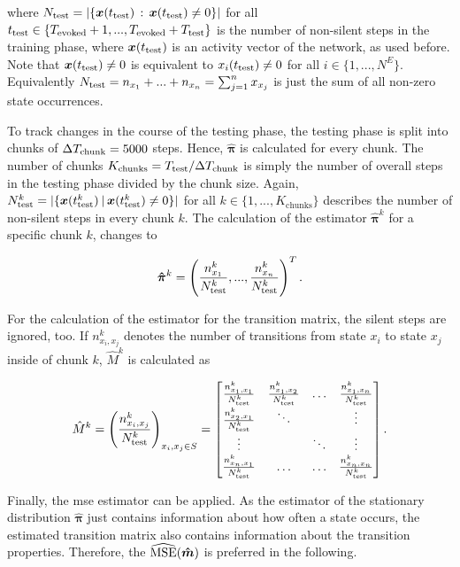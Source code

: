 where $N_{\text{test}} = |\{ \bm x(t_{\text{test}}) \,:\, \bm x(t_{\text{test}}) \neq 0 \}|$ for all $t_{\text{test}} \in \{ T_{\text{evoked}} + 1, ..., T_{\text{evoked}}+T_{\text{test}} \}$ is the number of non-silent steps in the training phase, where $\bm x(t_{\text{test}})$ is an activity vector of the network, as used before. Note that $\bm x(t_{\text{test}}) \neq 0$ is equivalent to $x_i(t_{\text{test}}) \neq 0$ for all $i \in \{1,...,N^E\}$. Equivalently $N_{\text{test}} = n_{x_1} + ... + n_{x_n} = \sum_{j=1}^n x_{x_j}$ is just the sum of all non-zero state occurrences.

To track changes in the course of the testing phase, the testing phase is split into chunks of $\Delta T_{\text{chunk}} = 5000$ steps. Hence, $\bm{\hat\pi}$ is calculated for every chunk. The number of chunks $K_{\text{chunks}} = T_{\text{test}}/\Delta T_{\text{chunk}}$ is simply the number of overall steps in the testing phase divided by the chunk size. Again, $N_{\text{test}}^k = |\{ \bm x(t_{\text{test}}^k) \:|\, \bm x(t_{\text{test}}^k) \neq 0 \}|$ for all $k \in \{ 1, ..., K_{\text{chunks}} \}$ describes the number of non-silent steps in every chunk $k$. The calculation of the estimator $\bm{\hat\pi}^k$ for a specific chunk $k$, changes to

\begin{equation}
\bm{\hat\pi}^k = \left( \frac{n_{x_1}^k}{N_{\text{test}}^k}, ..., \frac{n_{x_n}^k}{N_{\text{test}}^k} \right)^T.
\end{equation}

For the calculation of the estimator for the transition matrix, the silent steps are ignored, too. If $n_{x_i, x_j}^k$ denotes the number of transitions from state $x_i$ to state $x_j$ inside of chunk $k$, $\hat M^k$ is calculated as

\begin{equation}
\label{eq:transition-estimation}
\hat M^k = \left(\frac{n_{x_i, x_j}^k}{N_{\text{test}}^k}\right)_{x_i,x_j \in S} = \begin{bmatrix}
\frac{n_{x_1,x_1}^k}{N_{\text{test}}^k} & \frac{n_{x_1,x_2}^k}{N_{\text{test}}^k} & \hdots  & \frac{n_{x_1,x_n}^k}{N_{\text{test}}^k}\\
\frac{n_{x_2,x_1}^k}{N_{\text{test}}^k} & \ddots &  & \vdots \\
\vdots &  & \ddots & \vdots \\
\frac{n_{x_n,x_1}^k}{N_{\text{test}}^k} & \hdots & \hdots & \frac{n_{x_n,x_n}^k}{N_{\text{test}}^k}
\end{bmatrix}.
\end{equation}

Finally, the \ac{mse} estimator can be applied. As the estimator of the stationary distribution $\bm{\hat\pi}$ just contains information about how often a state occurs, the estimated transition matrix also contains information about the transition properties. Therefore, the $\widehat{\text{MSE}}(\bm{\hat m})$ is preferred in the following.

